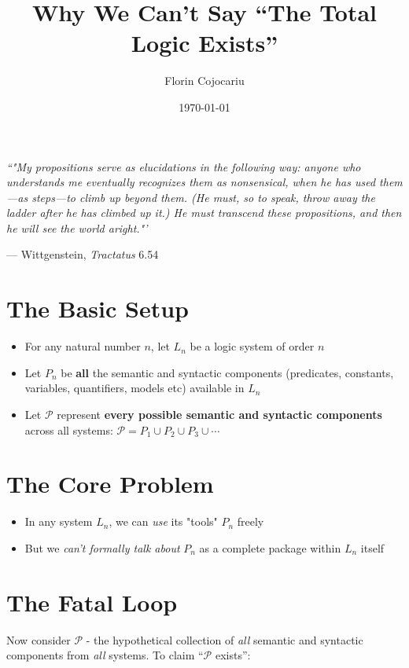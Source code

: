 \documentclass[12pt]{article}
\title{Why We Can't Say ``The Total Logic Exists''}
\author{Florin Cojocariu}
\date{\today}
\newcommand{\Pround}{\mathscr{P}}
\begin{document}
\maketitle

\epigraph{\textit{``"My propositions serve as elucidations in the following way: anyone who understands me eventually recognizes them as nonsensical, when he has used them—as steps—to climb up beyond them. (He must, so to speak, throw away the ladder after he has climbed up it.)
He must transcend these propositions, and then he will see the world aright."'}}{--- Wittgenstein, \textit{Tractatus} 6.54}

\section{The Basic Setup}

\begin{itemize}
    \item For any natural number $n$, let $L_n$ be a logic system of order $n$
    \item Let $P_n$ be \textbf{all} the semantic and syntactic components (predicates, constants, variables, quantifiers, models etc) available in $L_n$
    \item Let $\Pround$ represent \textbf{every possible semantic and syntactic components} across all systems: $\Pround = P_1 \cup P_2 \cup P_3 \cup \cdots$
\end{itemize}

\section{The Core Problem}

\begin{itemize}
    \item In any system $L_n$, we can \textit{use} its "tools" $P_n$ freely
    \item But we \textit{can't formally talk about} $P_n$ as a complete package within $L_n$ itself
\end{itemize}

\section{The Fatal Loop}

Now consider $\Pround$ - the hypothetical collection of \textit{all} semantic and syntactic components from \textit{all} systems. To claim ``$\Pround$ exists'':
\end{document}
